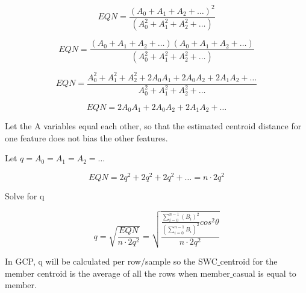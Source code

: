 \documentclass[11pt, onecolumn]{article}
\begin{document}
\begin{equation}
EQN  =   \frac{(A_0 + A_1 + A_2 + \ldots)^{2} }{(A_{0}^{2} + A_{1}^{2} + A_{2}^{2} + \ldots)} 
\end{equation}

\begin{equation}
EQN  =   \frac{(A_0 + A_1 + A_2 + \ldots)(A_0 + A_1 + A_2 + \ldots) }{(A_{0}^{2} + A_{1}^{2} + A_{2}^{2} + \ldots)} 
\end{equation}

\begin{equation}
EQN  =   \frac{A_{0}^{2} + A_{1}^{2} + A_{2}^{2} + 2A_{0}A_{1} + 2A_{0}A_{2} + 2A_{1}A_{2} + \ldots }{A_{0}^{2} + A_{1}^{2} + A_{2}^{2} + \ldots} 
\end{equation}

\begin{equation}
EQN  =  2A_{0}A_{1} + 2A_{0}A_{2} + 2A_{1}A_{2} + \ldots
\end{equation}

Let the A variables equal each other, so that the estimated centroid distance for one feature does not bias the other features. 

Let $q = A_0 = A_1 = A_2 = \ldots $ 

\begin{equation}
EQN  =  2q^{2} + 2q^{2} + 2q^{2} + \ldots = n \cdot 2q^{2}
\end{equation}

Solve for q

\begin{equation}
q  =  \sqrt{ \frac{ EQN }{ n \cdot 2q^{2} }} = \sqrt{ \frac{ \frac{ \sum^{n-1}_{i=0} (B_i)^{2}} { (\sum^{n-1}_{i=0} B_i)^{2} } cos^{2} \theta }{ n \cdot 2q^{2} }}
\end{equation}

In GCP, q will be calculated per row/sample so the SWC$\_$centroid for the member centroid is the average of all the rows when member$\_$casual is equal to member.
\end{document}
